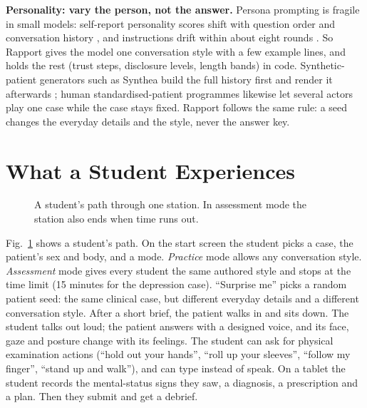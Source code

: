 \documentclass{article}
\begin{document}
\textbf{Personality: vary the person, not the answer.} Persona prompting is fragile in small models: self-report personality scores shift with
question order and conversation history \cite{tosato2025persist}, and instructions drift within about eight rounds \cite{li2024instruction}.
So Rapport gives the model one conversation style with a few example lines, and holds the rest (trust steps, disclosure levels, length bands)
in code. Synthetic-patient generators such as Synthea build the full history first and render it afterwards \cite{walonoski2018synthea}; human
standardised-patient programmes likewise let several actors play one case while the case stays fixed. Rapport follows the same rule: a seed
changes the everyday details and the style, never the answer key.

\section{What a Student Experiences}

\begin{figure}[t]
\caption{A student's path through one station. In assessment mode the station also ends when time runs out.}
\label{fig:journey}
\end{figure}

Fig.~\ref{fig:journey} shows a student's path. On the start screen the student picks a case, the patient's sex and body, and a mode. \emph{Practice} mode allows any conversation style. \emph{Assessment} mode gives every student the same authored style and stops at the time limit (15 minutes for the depression case). ``Surprise me'' picks a random patient seed: the same clinical case, but different everyday details and a different conversation
style. After a short brief, the patient walks in and sits down. The student talks out loud; the patient answers with a designed voice, and its face,
gaze and posture change with its feelings. The student can ask for physical examination actions (``hold out your hands'', ``roll up your sleeves'',
``follow my finger'', ``stand up and walk''), and can type instead of speak. On a tablet the student records the mental-status signs they saw, a
diagnosis, a prescription and a plan. Then they submit and get a debrief.
\end{document}
